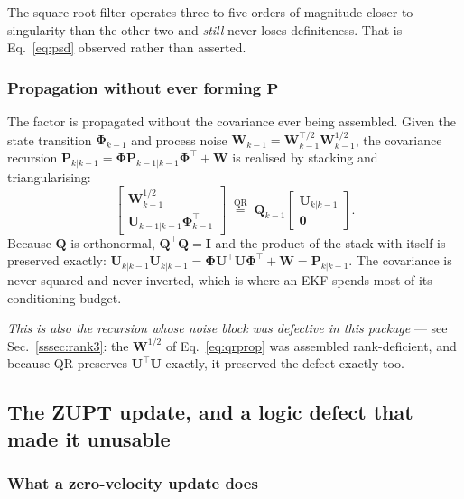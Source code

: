 The square-root filter operates three to five orders of magnitude closer to
singularity than the other two and \emph{still} never loses definiteness. That
is Eq.~\eqref{eq:psd} observed rather than asserted.

\subsubsection{Propagation without ever forming \texorpdfstring{$\mathbf{P}$}{P}}

The factor is propagated without the covariance ever being assembled. Given the
state transition $\boldsymbol{\Phi}_{k-1}$ and process noise
$\mathbf{W}_{k-1}=\mathbf{W}_{k-1}^{\top/2}\mathbf{W}_{k-1}^{1/2}$, the
covariance recursion
$\mathbf{P}_{k|k-1}=\boldsymbol{\Phi}\mathbf{P}_{k-1|k-1}\boldsymbol{\Phi}^{\top}+\mathbf{W}$
is realised by stacking and triangularising:
%
\begin{equation}
  \begin{bmatrix}
    \mathbf{W}_{k-1}^{1/2} \\[2pt]
    \mathbf{U}_{k-1|k-1}\boldsymbol{\Phi}_{k-1}^{\top}
  \end{bmatrix}
  \;\stackrel{\mathrm{QR}}{=}\;
  \mathbf{Q}_{k-1}
  \begin{bmatrix} \mathbf{U}_{k|k-1} \\ \mathbf{0} \end{bmatrix}.
  \label{eq:qrprop}
\end{equation}
%
Because $\mathbf{Q}$ is orthonormal, $\mathbf{Q}^{\top}\mathbf{Q}=\mathbf{I}$
and the product of the stack with itself is preserved exactly:
$\mathbf{U}_{k|k-1}^{\top}\mathbf{U}_{k|k-1}
=\boldsymbol{\Phi}\mathbf{U}^{\top}\mathbf{U}\boldsymbol{\Phi}^{\top}+\mathbf{W}
=\mathbf{P}_{k|k-1}$. The covariance is never squared and never inverted, which
is where an EKF spends most of its conditioning budget.

\emph{This is also the recursion whose noise block was defective in this
package} --- see Sec.~\ref{sssec:rank3}: the $\mathbf{W}^{1/2}$ of
Eq.~\eqref{eq:qrprop} was assembled rank-deficient, and because QR preserves
$\mathbf{U}^{\top}\mathbf{U}$ exactly, it preserved the defect exactly too.

\subsection{The ZUPT update, and a logic defect that made it unusable}
\label{ssec:zupt}

\subsubsection{What a zero-velocity update does}

